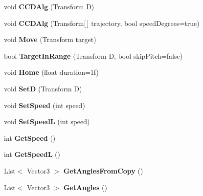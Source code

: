 \begin{DoxyCompactItemize}
\item 
\mbox{\label{class_i_k_aa28704730e12709936ba319e326a4173}} 
void {\bfseries C\+C\+D\+Alg} (Transform D)
\item 
\mbox{\label{class_i_k_a647580fce8d20924d081e6c056495e95}} 
void {\bfseries C\+C\+D\+Alg} (Transform\mbox{[}$\,$\mbox{]} trajectory, bool speed\+Degrees=true)
\item 
\mbox{\label{class_i_k_a9959bf459122a560124c9aac8191cbe6}} 
void {\bfseries Move} (Transform target)
\item 
\mbox{\label{class_i_k_ad97122f89dfb2c5bff5605cbcf5c5cc7}} 
bool {\bfseries Target\+In\+Range} (Transform D, bool skip\+Pitch=false)
\item 
\mbox{\label{class_i_k_a1a8f3eb230e800c10dec985b81623121}} 
void {\bfseries Home} (float duration=1f)
\item 
\mbox{\label{class_i_k_aa97be23f240e84f80c9d1709877e46f4}} 
void {\bfseries SetD} (Transform D)
\item 
\mbox{\label{class_i_k_af3fe9338cf146836289725c4d7f001ff}} 
void {\bfseries Set\+Speed} (int speed)
\item 
\mbox{\label{class_i_k_afc1472fadfc08f9df7374af09ca83110}} 
void {\bfseries Set\+SpeedL} (int speed)
\item 
\mbox{\label{class_i_k_a4560c82ff2f46414e095e7fb37283f39}} 
int {\bfseries Get\+Speed} ()
\item 
\mbox{\label{class_i_k_ae3121a6a82a3ae9216c480d4e9f117a9}} 
int {\bfseries Get\+SpeedL} ()
\item 
\mbox{\label{class_i_k_a041e3cba939af2806b7af200edf3161c}} 
List$<$ Vector3 $>$ {\bfseries Get\+Angles\+From\+Copy} ()
\item 
\mbox{\label{class_i_k_a47ceb1a675024943c1714072b1b0d01f}} 
List$<$ Vector3 $>$ {\bfseries Get\+Angles} ()

\end{DoxyCompactItemize}
